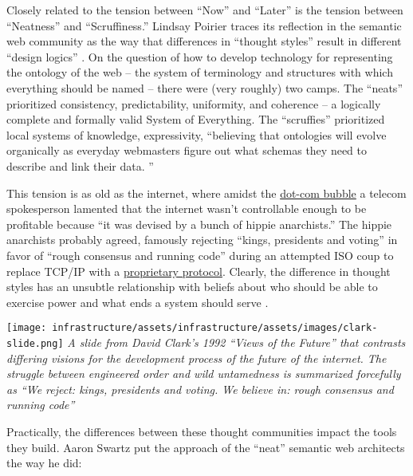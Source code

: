 Closely related to the tension between ``Now'' and ``Later'' is the
tension between ``Neatness'' and ``Scruffiness.'' Lindsay Poirier traces
its reflection in the semantic web community as the way that differences
in ``thought styles'' result in different ``design logics'' \citep{poirierTurnScruffyEthnographic2017} . On the question of how to
develop technology for representing the ontology of the web -- the
system of terminology and structures with which everything should be
named -- there were (very roughly) two camps. The ``neats'' prioritized
consistency, predictability, uniformity, and coherence -- a logically
complete and formally valid System of Everything. The ``scruffies''
prioritized local systems of knowledge, expressivity, ``believing that
ontologies will evolve organically as everyday webmasters figure out
what schemas they need to describe and link their data. \citep{poirierTurnScruffyEthnographic2017} ''

This tension is as old as the internet, where amidst the
\href{https://en.wikipedia.org/wiki/Dot-com_bubble}{dot-com bubble} a
telecom spokesperson lamented that the internet wasn't controllable
enough to be profitable because ``it was devised by a bunch of hippie
anarchists.'' \citep{hiltzikTamingWildWild2001}  The hippie
anarchists probably agreed, famously rejecting ``kings, presidents and
voting'' in favor of ``rough consensus and running code'' during an
attempted ISO coup to replace TCP/IP with a
\href{https://www.iso.org/standard/35872.html}{proprietary protocol}.
Clearly, the difference in thought styles has an unsubtle relationship
with beliefs about who should be able to exercise power and what ends a
system should serve \citep{larsenPoliticalNatureTCP2012} .

\texttt{[image: infrastructure/assets/infrastructure/assets/images/clark-slide.png]} \emph{A
slide from David Clark's 1992 ``Views of the Future''\citep{clarkCloudyCrystalBall1992}  that contrasts differing visions for the
development process of the future of the internet. The struggle between
engineered order and wild untamedness is summarized forcefully as ``We
reject: kings, presidents and voting. We believe in: rough consensus and
running code''}

Practically, the differences between these thought communities impact
the tools they build. Aaron Swartz put the approach of the ``neat''
semantic web architects the way he did:

